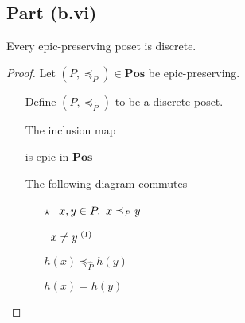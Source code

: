 \subsection{Part (b.vi)}\label{sec:q-1-b-vi}

\begin{prop}
  Every epic-preserving poset is discrete.

  \begin{proof}
    Let $(P,\preceq_P)\in\mathbf{Pos}$ be epic-preserving.
    \begin{itemize}
      \item[\phantom{\imps}]
        Define $(P, \preceq_{\hat{P}})$ to be a discrete poset.

      \item[\imps]
        The inclusion map
        is epic in $\mathbf{Pos}$

      \item[\imps] The following diagram commutes
        \begin{center}
        \end{center}

      \item[\phantom{\imps}]
        \begin{itemize}
          \item[$\star$]
            \Let~$x,y\in P\ldotp~x\preceq_P y$
            \marginnote{\Hyp}

          \item[\phantom{\imps}]\Ass~$x\neq y^{\text~(1)}$
            \marginnote{\Hyp}

          \item[\imps] $h(x) \preceq_{\hat{P}} h(y)$

          \item[\imps]
            $h(x) = h(y)$


\end{itemize}
\end{itemize}
\end{proof}
\end{prop}
